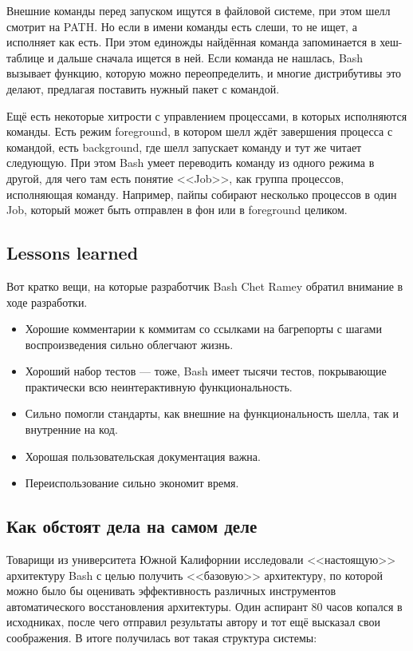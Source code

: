 \documentclass[a5paper]{article}
\begin{document}
Внешние команды перед запуском ищутся в файловой системе, при этом шелл смотрит на PATH. Но если в имени команды есть слеши, то не ищет, а исполняет как есть. При этом единожды найдённая команда запоминается в хеш-таблице и дальше сначала ищется в ней. Если команда не нашлась, Bash вызывает функцию, которую можно переопределить, и многие дистрибутивы это делают, предлагая поставить нужный пакет с командой.

Ещё есть некоторые хитрости с управлением процессами, в которых исполняются команды. Есть режим foreground, в котором шелл ждёт завершения процесса с командой, есть background, где шелл запускает команду и тут же читает следующую. При этом Bash умеет переводить команду из одного режима в другой, для чего там есть понятие <<Job>>, как группа процессов, исполняющая команду. Например, пайпы собирают несколько процессов в один Job, который может быть отправлен в фон или в foreground целиком.

\subsection{Lessons learned}

Вот кратко вещи, на которые разработчик Bash Chet Ramey обратил внимание в ходе разработки.

\begin{itemize}
    \item Хорошие комментарии к коммитам со ссылками на багрепорты с шагами воспроизведения сильно облегчают жизнь.
    \item Хороший набор тестов --- тоже, Bash имеет тысячи тестов, покрывающие практически всю неинтерактивную функциональность.
    \item Сильно помогли стандарты, как внешние на функциональность шелла, так и внутренние на код.
    \item Хорошая пользовательская документация важна.
    \item Переиспользование сильно экономит время.
\end{itemize}

\subsection{Как обстоят дела на самом деле}

Товарищи из университета Южной Калифорнии исследовали <<настоящую>> архитектуру Bash с целью получить <<базовую>> архитектуру, по которой можно было бы оценивать эффективность различных инструментов автоматического восстановления архитектуры. Один аспирант 80 часов копался в исходниках, после чего отправил результаты автору и тот ещё высказал свои соображения. В итоге получилась вот такая структура системы:
\end{document}
